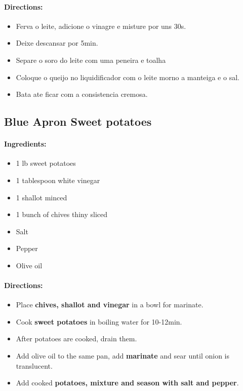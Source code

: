 \documentclass{article}
\begin{document}
\paragraph{Directions:}
\begin{itemize}
    \item Ferva o leite, adicione o vinagre e misture por uns 30s.
    \item Deixe descansar por 5min.
    \item Separe o soro do leite com uma peneira e toalha
    \item Coloque o queijo no liquidificador com o leite morno a manteiga e o sal.
    \item Bata ate ficar com a consistencia cremosa.
\end{itemize}

\subsection{Blue Apron Sweet potatoes}

\paragraph{Ingredients:}
\begin{itemize}
    \item 1 lb sweet potatoes
    \item 1 tablespoon white vinegar
    \item 1 shallot minced
    \item 1 bunch of chives thiny sliced
    \item Salt
    \item Pepper
    \item Olive oil
\end{itemize}

\paragraph{Directions:}
\begin{itemize}
    \item Place \textbf{chives, shallot and vinegar} in a bowl for marinate.
    \item Cook \textbf{sweet potatoes} in boiling water for 10-12min.
    \item After potatoes are cooked, drain them.
    \item Add olive oil to the same pan, add \textbf{marinate} and sear until onion is translucent.
    \item Add cooked \textbf{potatoes, mixture and season with salt and pepper}.
\end{itemize}
\end{document}
